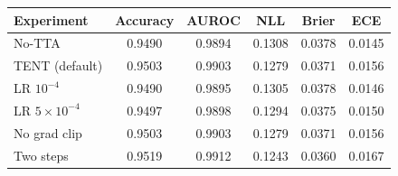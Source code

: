 \footnotesize
\setlength{\tabcolsep}{2.5pt}
\begin{tabular}{lccccc}
\toprule
Experiment & Accuracy & AUROC & NLL & Brier & ECE \\
\midrule
No-TTA & 0.9490 & 0.9894 & 0.1308 & 0.0378 & 0.0145 \\
TENT (default) & 0.9503 & 0.9903 & 0.1279 & 0.0371 & 0.0156 \\
LR $10^{-4}$ & 0.9490 & 0.9895 & 0.1305 & 0.0378 & 0.0146 \\
LR $5{\times}10^{-4}$ & 0.9497 & 0.9898 & 0.1294 & 0.0375 & 0.0150 \\
No grad clip & 0.9503 & 0.9903 & 0.1279 & 0.0371 & 0.0156 \\
Two steps & 0.9519 & 0.9912 & 0.1243 & 0.0360 & 0.0167 \\
\bottomrule
\end{tabular}
